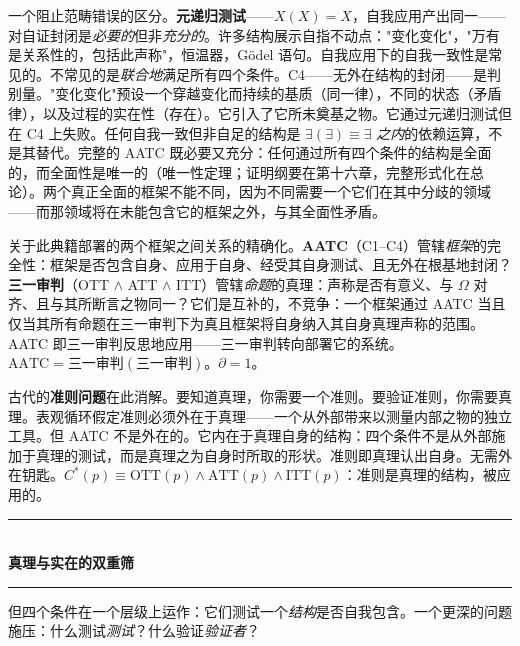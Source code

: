 \documentclass[10pt, openany, oneside]{book}
\renewcommand{\normalsize}{\fontsize{10}{13}\selectfont}
\begin{document}
一个阻止范畴错误的区分。\textbf{元递归测试}——$X(X) = X$，自我应用产出同一——对自证封闭是\textit{必要的}但非\textit{充分的}。许多结构展示自指不动点："变化变化"，"万有是关系性的，包括此声称"，恒温器，Gödel 语句。自我应用下的自我一致性是常见的。不常见的是\textit{联合地}满足所有四个条件。C4——无外在结构的封闭——是判别量。"变化变化"预设一个穿越变化而持续的基质（同一律），不同的状态（矛盾律），以及过程的实在性（存在）。它引入了它所未奠基之物。它通过元递归测试但在 C4 上失败。任何自我一致但非自足的结构是 $\exists(\exists) \equiv \exists$ \textit{之内}的依赖运算，不是其替代。完整的 AATC 既必要又充分：任何通过所有四个条件的结构是全面的，而全面性是唯一的（唯一性定理；证明纲要在第十六章，完整形式化在总论）。两个真正全面的框架不能不同，因为不同需要一个它们在其中分歧的领域——而那领域将在未能包含它的框架之外，与其全面性矛盾。

关于此典籍部署的两个框架之间关系的精确化。\textbf{AATC}（C1--C4）管辖\textit{框架}的完全性：框架是否包含自身、应用于自身、经受其自身测试、且无外在根基地封闭？\textbf{三一审判}（OTT $\wedge$ ATT $\wedge$ ITT）管辖\textit{命题}的真理：声称是否有意义、与 $\Omega$ 对齐、且与其所断言之物同一？它们是互补的，不竞争：一个框架通过 AATC 当且仅当其所有命题在三一审判下为真且框架将自身纳入其自身真理声称的范围。AATC 即三一审判反思地应用——三一审判转向部署它的系统。$\text{AATC} = \text{三一审判}(\text{三一审判})$。$\partial = 1$。

古代的\textbf{准则问题}在此消解。要知道真理，你需要一个准则。要验证准则，你需要真理。表观循环假定准则必须外在于真理——一个从外部带来以测量内部之物的独立工具。但 AATC 不是外在的。它内在于真理自身的结构：四个条件不是从外部施加于真理的测试，而是真理之为自身时所取的形状。准则即真理认出自身。无需外在钥匙。$C^*(p) \equiv \text{OTT}(p) \wedge \text{ATT}(p) \wedge \text{ITT}(p)$：准则是真理的结构，被应用的。

\vspace{1.5em}


\begin{center}
    \rule{0.3\textwidth}{0.4pt}\\[0.5em]
    {\normalsize\bfseries\scshape 真理与实在的双重筛}\\[0.3em]
    \rule{0.3\textwidth}{0.4pt}
\end{center}

\vspace{1em}

\noindent 但四个条件在一个层级上运作：它们测试一个\textit{结构}是否自我包含。一个更深的问题施压：什么测试\textit{测试}？什么验证\textit{验证者}？
\end{document}
